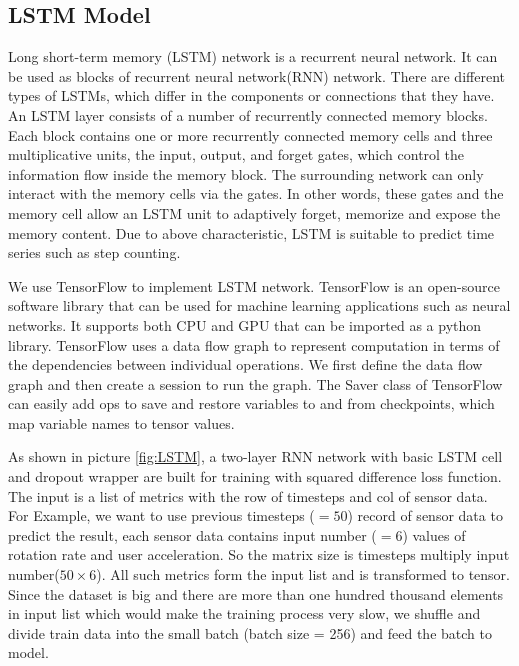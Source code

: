 \documentclass[11pt]{article}
\begin{document}
{\subsection{LSTM Model}
Long short-term memory (LSTM) network is a recurrent neural network. It can be used as blocks of recurrent neural network(RNN) network. There are different types of LSTMs, which differ in the components or connections that they have. An LSTM layer consists of a number of recurrently connected memory blocks. Each block contains one or more recurrently connected memory cells and three multiplicative units, the input, output, and forget gates, which control the information flow inside the memory block. The surrounding network can only interact with the memory cells via the gates. In other words, these gates and the memory cell allow an LSTM unit to adaptively forget, memorize and expose the memory content. Due to above characteristic, LSTM is suitable to predict time series such as step counting.

We use TensorFlow to implement LSTM network. TensorFlow is an open-source software library that can be used for machine learning applications such as neural networks. It supports both CPU and GPU that can be imported as a python library. TensorFlow uses a data flow graph to represent computation in terms of the dependencies between individual operations. We first define the data flow graph and then create a session to run the graph. The Saver class of TensorFlow can easily add ops to save and restore variables to and from checkpoints, which map variable names to tensor values.

As shown in picture \ref{fig:LSTM}, a two-layer RNN network with basic LSTM cell and dropout wrapper are built for training with squared difference loss function. The input is a list of metrics with the row of timesteps and col of sensor data. For Example, we want to use previous timesteps ($=50$) record of sensor data to predict the result, each sensor data contains input number ($=6$) values of rotation rate and user acceleration. So the matrix size is timesteps multiply input number($50 \times 6$). All such metrics form the input list and is transformed to tensor. Since the dataset is big and there are more than one hundred thousand elements in input list which would make the training process very slow, we shuffle and divide train data into the small batch (batch size = 256) and feed the batch to model.

}
\end{document}
